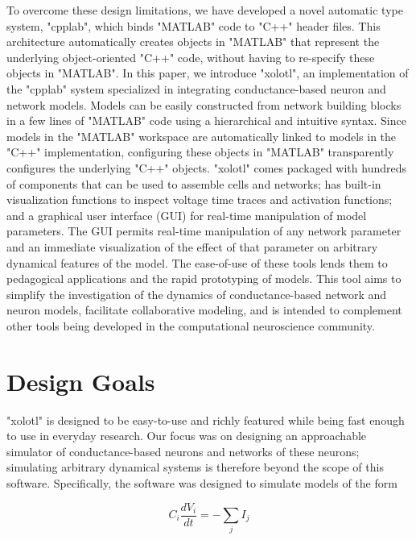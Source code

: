 \documentclass{frontiersSCNS} %
\begin{document}
To overcome these design limitations, we have developed a novel automatic type system, "cpplab", which binds "MATLAB" code to "C++" header files. This architecture automatically creates objects in "MATLAB" that represent the underlying object-oriented "C++" code, without having to re-specify these objects in "MATLAB". In this paper, we introduce "xolotl", an implementation of the "cpplab" system specialized in integrating conductance-based neuron and network models. Models can be easily constructed from network building blocks in a few lines of "MATLAB" code using a hierarchical and intuitive syntax. Since models in the "MATLAB" workspace are automatically linked to models in the "C++" implementation, configuring these objects in "MATLAB" transparently configures the underlying "C++" objects. "xolotl" comes packaged with hundreds of components that can be used to assemble cells and networks;  has built-in visualization functions to inspect voltage time traces and activation functions; and a graphical user interface (GUI) for real-time manipulation of model parameters. The GUI permits real-time manipulation of any network parameter and an immediate visualization of the effect of that parameter on arbitrary dynamical features of the model. The ease-of-use of these tools lends them to pedagogical applications and the rapid prototyping of models. This tool aims to simplify the investigation of the dynamics of conductance-based network and neuron models, facilitate collaborative modeling, and is intended to complement other tools being developed in the computational neuroscience community.


%
%
%
%
%
%

\section{Design Goals}
\label{design}

"xolotl" is designed to be easy-to-use and richly featured while being fast enough to use in everyday research. Our focus was on designing an approachable simulator of conductance-based neurons and networks of these neurons; simulating arbitrary dynamical systems is therefore beyond the scope of this software. Specifically, the software was designed to simulate models of the form 


\begin{equation}
C_{i}\frac{dV_{i}}{dt}=-\sum_{j}I_{j} \label{eq:1}
\end{equation}
\end{document}
